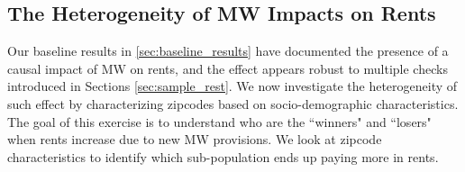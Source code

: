 \subsection{The Heterogeneity of MW Impacts on Rents}\label{sec:heter}

Our baseline results in \autoref{sec:baseline_results} have documented the presence of a causal 
impact of MW on rents, and the effect appears robust to multiple checks introduced in Sections 
\ref{sec:sample_rest}. We now investigate the heterogeneity of such effect 
by characterizing zipcodes based on socio-demographic characteristics. The goal of this exercise is 
to understand who are the ``winners" and ``losers" when rents increase 
due to new MW provisions. We look at zipcode characteristics to identify which sub-population ends 
up paying more in rents.

